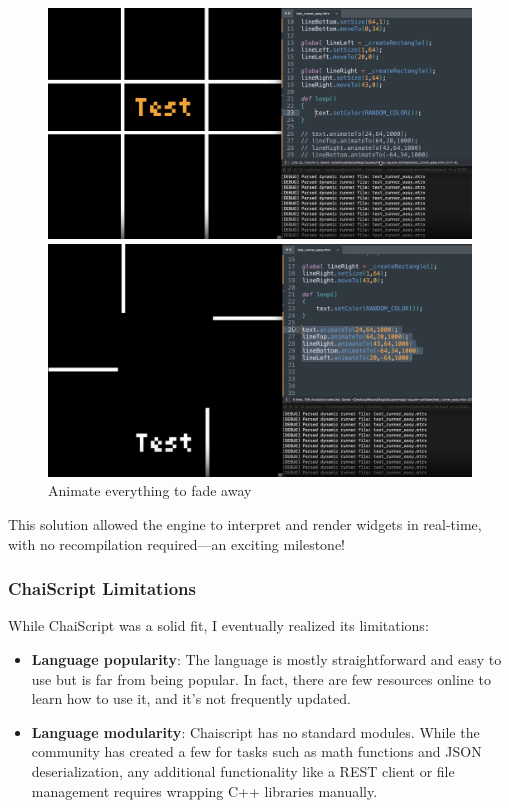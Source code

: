 \begin{figure}[h] \centering \begin{minipage}[b]{0.49\textwidth} \centering \includegraphics[width=\textwidth]{tesi/img/chai_demo/3.png} \caption*{Set text in random colors in the loop() function} \end{minipage} \begin{minipage}[b]{0.49\textwidth} \centering \includegraphics[width=\textwidth]{tesi/img/chai_demo/4.png} \caption*{Animate everything to fade away} \end{minipage} \end{figure}

This solution allowed the engine to interpret and render widgets in real-time, with no recompilation required—an exciting milestone!

\subsubsection{ChaiScript Limitations} While ChaiScript was a solid fit, I eventually realized its limitations:


\begin{itemize}
    \item \textbf{Language popularity}: The language is mostly straightforward and easy to use but is far from being popular. In fact, there are few resources online to learn how to use it, and it's not frequently updated.
    \item \textbf{Language modularity}: Chaiscript has no standard modules. While the community has created a few for tasks such as math functions and JSON deserialization, any additional functionality like a REST client or file management requires wrapping C++ libraries manually.
\end{itemize}


